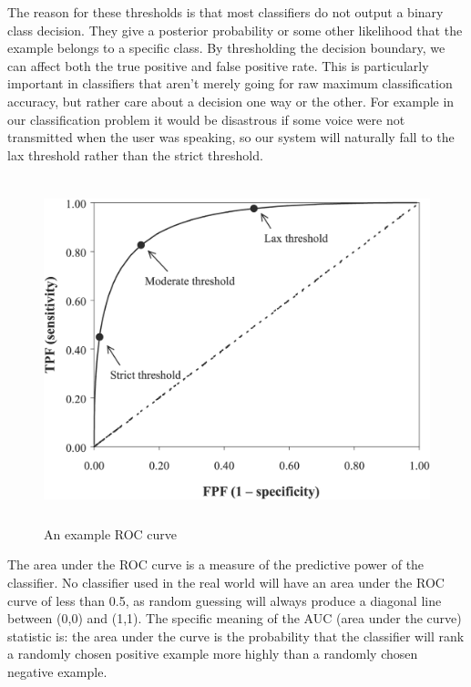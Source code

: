 \documentclass[ %
                    author={Sam Phippen},
                supervisor={Dr. Rafal Bogacz},
                     title={Real time voice activity detectors in noisy personal computing environments},
                  subtitle={},
                    degree={MEng},
                      year={2012} ]{thesis}
\begin{document}
The reason for these thresholds is that most classifiers do not output a binary
class decision. They give a posterior probability or some other likelihood that
the example belongs to a specific class. By thresholding the decision boundary,
we can affect both the true positive and false positive rate. This is
particularly important in classifiers that aren't merely going for raw maximum
classification accuracy, but rather care about a decision one way or the other.
For example in our classification problem it would be disastrous if some voice
were not transmitted when the user was speaking, so our system will naturally
fall to the lax threshold rather than the strict threshold.

\begin{figure}
    \label{fig:roc-example}
    \begin{center}
        \includegraphics[height=10cm]{roc_example.png}
    \end{center}
    \caption{An example ROC curve}
\end{figure}

The area under the ROC curve is a measure of the predictive power of the
classifier\cite{fawcett}. No classifier used in the real world will have an
area under the ROC curve of less than 0.5, as random guessing will always
produce a diagonal line between (0,0) and (1,1). The specific meaning of the
AUC (area under the curve) statistic is: the area under the curve is the
probability that the classifier will rank a randomly chosen positive example
more highly than a randomly chosen negative example.

\end{document}
